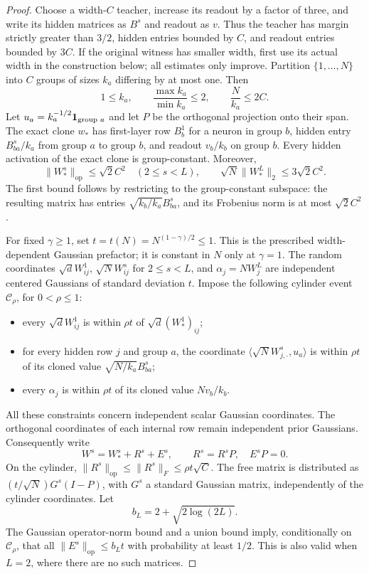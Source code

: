 \begin{proof}
Choose a width-$C$ teacher, increase its readout by a factor of three, and write
its hidden matrices as $B^s$ and readout as $v$. Thus the teacher has margin
strictly greater than $3/2$, hidden entries bounded by $C$, and readout entries
bounded by $3C$. If the original witness has smaller width, first use its actual
width in the construction below; all estimates only improve.
Partition $\{1,\ldots,N\}$ into $C$ groups of sizes $k_a$ differing by at most
one. Then
\[
 1\leq k_a,\qquad \frac{\max k_a}{\min k_a}\leq2,
 \qquad \frac N{k_a}\leq2C.
\]
Let $u_a=k_a^{-1/2}{\bf1}_{\text{group }a}$ and let $P$ be the orthogonal
projection onto their span. The exact clone $w_*$ has first-layer row $B^1_b$
for a neuron in group $b$, hidden entry $B^s_{ba}/k_a$ from group $a$ to group
$b$, and readout $v_b/k_b$ on group $b$. Every hidden activation of the exact
clone is group-constant. Moreover,
\[
 \|W_*^s\|_{\mathrm{op}}\leq\sqrt2 C^2\quad(2\leq s<L),
 \qquad \sqrt N\|W_*^L\|_2\leq3\sqrt2 C^2.
\]
The first bound follows by restricting to the group-constant subspace: the
resulting matrix has entries $\sqrt{k_b/k_a}B^s_{ba}$, and its Frobenius norm
is at most $\sqrt2 C^2$.

For fixed $\gamma\geq1$, set $t=t(N)=N^{(1-\gamma)/2}\leq1$.
This is the prescribed width-dependent Gaussian prefactor; it is constant
in $N$ only at $\gamma=1$. The random coordinates
$\sqrt d W^1_{ij}$, $\sqrt N W^s_{ij}$ for $2\leq s<L$, and
$\alpha_j=NW^L_j$ are independent centered Gaussians of standard deviation
$t$. Impose the following cylinder event $\mathcal C_\rho$, for
$0<\rho\leq1$:
\begin{itemize}
\item every $\sqrt d W^1_{ij}$ is within $\rho t$ of
$\sqrt d (W_*^1)_{ij}$;
\item for every hidden row $j$ and group $a$, the coordinate
$\langle\sqrt N W^s_{j,\cdot},u_a\rangle$ is within $\rho t$ of its
cloned value $\sqrt{N/k_a}B^s_{ba}$;
\item every $\alpha_j$ is within $\rho t$ of its cloned value $Nv_b/k_b$.
\end{itemize}
All these constraints concern independent scalar Gaussian coordinates.
The orthogonal coordinates of each internal row remain independent prior
Gaussians. Consequently write
\[
 W^s=W_*^s+R^s+E^s,\qquad R^s=R^sP,\quad E^sP=0.
\]
On the cylinder, $\|R^s\|_{\mathrm{op}}\leq\|R^s\|_F\leq\rho t\sqrt C$.
The free matrix is distributed as $(t/\sqrt N)G^s(I-P)$, with $G^s$ a standard
Gaussian matrix, independently of the cylinder coordinates. Let
\[
 b_L=2+\sqrt{2\log(2L)}.
\]
The Gaussian operator-norm bound and a union bound imply, conditionally on
$\mathcal C_\rho$, that all $\|E^s\|_{\mathrm{op}}\leq b_Lt$ with probability
at least $1/2$. This is also valid when $L=2$, where there are no such matrices.


\end{proof}
